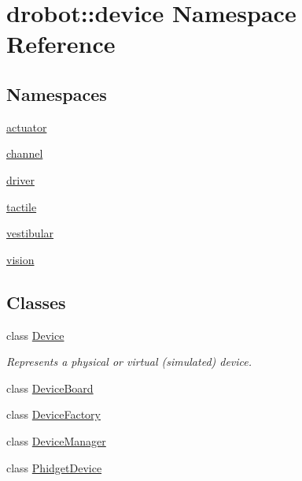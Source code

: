 \hypertarget{namespacedrobot_1_1device}{\section{drobot\-:\-:device Namespace Reference}
\label{namespacedrobot_1_1device}
}
\subsection*{Namespaces}
\begin{DoxyCompactItemize}
\item 
\hyperlink{namespacedrobot_1_1device_1_1actuator}{actuator}
\item 
\hyperlink{namespacedrobot_1_1device_1_1channel}{channel}
\item 
\hyperlink{namespacedrobot_1_1device_1_1driver}{driver}
\item 
\hyperlink{namespacedrobot_1_1device_1_1tactile}{tactile}
\item 
\hyperlink{namespacedrobot_1_1device_1_1vestibular}{vestibular}
\item 
\hyperlink{namespacedrobot_1_1device_1_1vision}{vision}
\end{DoxyCompactItemize}
\subsection*{Classes}
\begin{DoxyCompactItemize}
\item 
class \hyperlink{classdrobot_1_1device_1_1Device}{Device}
\begin{DoxyCompactList}\small\item\em Represents a physical or virtual (simulated) device. \end{DoxyCompactList}\item 
class \hyperlink{classdrobot_1_1device_1_1DeviceBoard}{Device\-Board}
\item 
class \hyperlink{classdrobot_1_1device_1_1DeviceFactory}{Device\-Factory}
\item 
class \hyperlink{classdrobot_1_1device_1_1DeviceManager}{Device\-Manager}
\item 
class \hyperlink{classdrobot_1_1device_1_1PhidgetDevice}{Phidget\-Device}
\end{DoxyCompactItemize}
